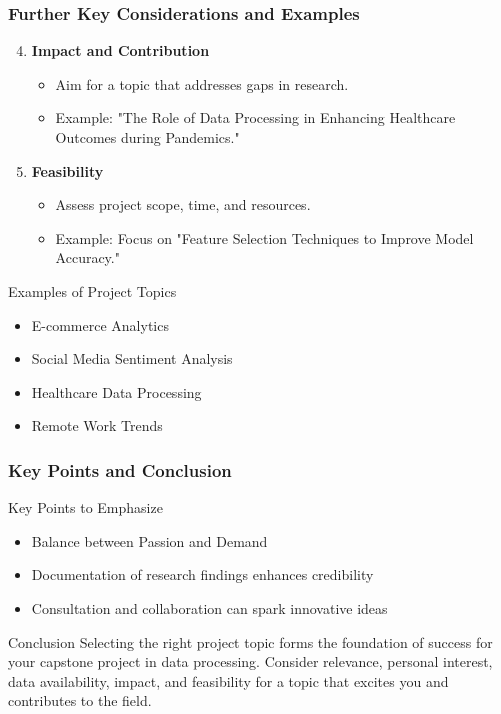 \documentclass[aspectratio=169]{beamer}
\begin{document}
\begin{frame}[fragile]
    \frametitle{Further Key Considerations and Examples}
    \begin{enumerate}
        \setcounter{enumi}{3}
        \item \textbf{Impact and Contribution}
            \begin{itemize}
                \item Aim for a topic that addresses gaps in research.
                \item Example: "The Role of Data Processing in Enhancing Healthcare Outcomes during Pandemics."
            \end{itemize}
        \item \textbf{Feasibility}
            \begin{itemize}
                \item Assess project scope, time, and resources.
                \item Example: Focus on "Feature Selection Techniques to Improve Model Accuracy."
            \end{itemize}
    \end{enumerate}
    \vspace{1em}
    \begin{block}{Examples of Project Topics}
        \begin{itemize}
            \item E-commerce Analytics
            \item Social Media Sentiment Analysis
            \item Healthcare Data Processing
            \item Remote Work Trends
        \end{itemize}
    \end{block}
\end{frame}

\begin{frame}[fragile]
    \frametitle{Key Points and Conclusion}
    \begin{block}{Key Points to Emphasize}
        \begin{itemize}
            \item Balance between Passion and Demand
            \item Documentation of research findings enhances credibility
            \item Consultation and collaboration can spark innovative ideas
        \end{itemize}
    \end{block}
    \begin{block}{Conclusion}
        Selecting the right project topic forms the foundation of success for your capstone project in data processing. Consider relevance, personal interest, data availability, impact, and feasibility for a topic that excites you and contributes to the field.
    \end{block}
\end{frame}
\end{document}
